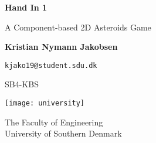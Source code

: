 \begin{titlepage}
    \begin{center}
        \vspace*{1cm}
        \textbf{Hand In 1}
        \vspace{0.5cm}

        A Component-based 2D Asteroids Game
        \vspace{1.5cm}

        \textbf{Kristian Nymann Jakobsen} 
        \vspace{0.5cm}

        \texttt{kjako19@student.sdu.dk}
        \vfill

        SB4-KBS
        \vspace{0.8cm}

        \texttt{[image: university]}
        \vspace{0.5cm}

        The Faculty of Engineering \\
        University of Southern Denmark\\
        \date{\today}
    \end{center}
\end{titlepage}
